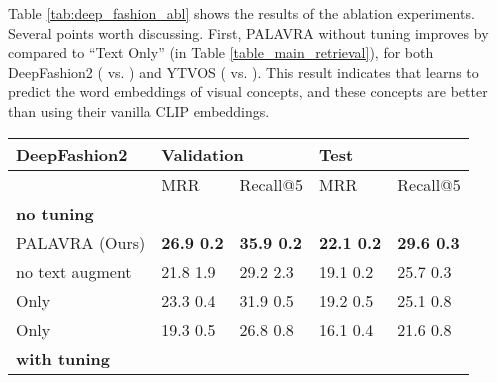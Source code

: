 \documentclass[runningheads]{llncs}
\begin{document}
Table \ref{tab:deep_fashion_abl} shows the results of the ablation experiments.
Several points worth discussing. First, PALAVRA without tuning improves by  compared to ``Text Only'' (in Table \ref{table_main_retrieval}), for both DeepFashion2 ( vs. ) and YTVOS ( vs. ). This result indicates that  learns to predict the word embeddings of visual concepts, and these concepts are better than using their vanilla CLIP embeddings.

\begin{table}[t]
\centering
\begin{tabular}{l|ll|ll}
    \toprule
    {DeepFashion2} &    \multicolumn{2}{l|}{Validation}       &    \multicolumn{2}{l}{Test} \\
    \toprule
    {} &       MRR &     Recall@5 &       MRR &  Recall@5 \\
    \midrule
     {\textbf{no tuning}} &&\\
PALAVRA (Ours) &  \textbf{26.9  0.2} &  \textbf{35.9  0.2} &  \textbf{22.1  0.2} &  \textbf{29.6  0.3} \\
 no text augment  &  21.8  1.9 &  29.2  2.3 &  19.1  0.2 &  25.7  0.3 \\
Only  &  23.3  0.4 &  31.9  0.5 &  19.2  0.5 &  25.1  0.8 \\
Only    &  19.3  0.5 &  26.8  0.8 &  16.1  0.4 &  21.6  0.8 \\
          \toprule
   {\textbf{with tuning}} &&\\


\end{tabular}
\end{table}
\end{document}
